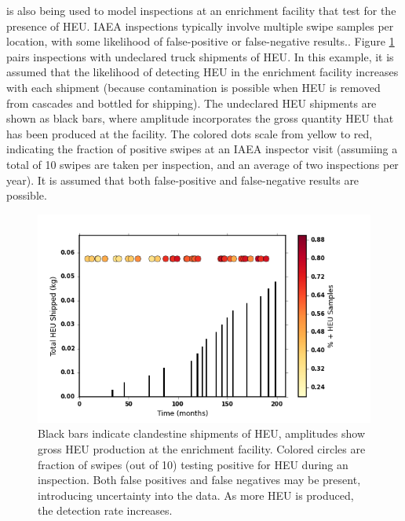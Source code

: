 \Cyclus is also being used to model inspections at an enrichment facility that test for the presence of \gls{HEU}. IAEA inspections typically involve multiple swipe samples per location, with some likelihood of false-positive or false-negative results.\cite{INSPECTION_FALSE?}.  Figure \ref{fig:inspect} pairs inspections with undeclared truck shipments of \gls{HEU}. In this example, it is assumed that the likelihood of detecting \gls{HEU} in the enrichment facility increases with each shipment (because contamination is possible when \gls{HEU} is removed from cascades and bottled for shipping).  The undeclared \gls{HEU} shipments are shown as black bars, where amplitude incorporates the gross quantity \gls{HEU} that has been produced at the facility. The colored dots scale from yellow to red, indicating the fraction of positive swipes at an \gls{IAEA} inspector visit (assumiing a total of 10 swipes are taken per inspection, and an average of two inspections per year).  It is assumed that both false-positive and false-negative results are possible. 

\begin{figure}%
\begin{center}
\includegraphics[natwidth=162bp,natheight=227bp, scale=0.6]{./figs/mm_5enrich_tinytails_inspinspect_ship.png}
\end{center}
\caption{Black bars indicate clandestine shipments of \gls{HEU}, amplitudes show gross \gls{HEU} production at the enrichment facility.  Colored circles are fraction of swipes (out of 10) testing positive for \gls{HEU} during an inspection. Both false positives and false negatives may be present, introducing uncertainty into the data. As more \gls{HEU} is produced, the detection rate increases.}
\label{fig:inspect}
\end{figure}

